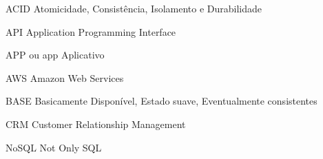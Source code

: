 \begin{siglas}
  \item[ACID] Atomicidade, Consistência, Isolamento e Durabilidade
  \item[API] Application Programming Interface
  \item[APP ou app] Aplicativo
  \item[AWS] Amazon Web Services
  \item[BASE] Basicamente Disponível, Estado suave, Eventualmente consistentes
  \item[CRM] Customer Relationship Management
  \item[NoSQL] Not Only SQL
\end{siglas}
